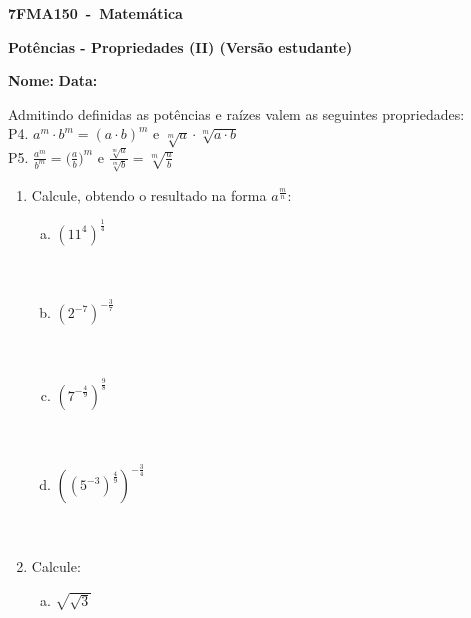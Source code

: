 \documentclass[a4paper,14pt]{article}
\begin{document}
	
	\noindent\textbf{7FMA150~-~Matemática} 
	
	\begin{center}
		\textbf{Potências - Propriedades (II) (Versão estudante)}
	\end{center}
	
	
	\noindent\textbf{Nome:} \underline{\hspace{10cm}}
    \noindent\textbf{Data:} \underline{\hspace{4cm}}
	
	
	\begin{multicols}{2}
		Admitindo definidas as potências e raízes valem as seguintes propriedades: \\
		P4. $a^m \cdot b^m = (a \cdot b)^m$ e $\sqrt[m]{a} \cdot \sqrt[m]{a \cdot b}$\\
		P5. $\frac{a^m}{b^m} = \bigg(\frac{a}{b}\bigg)^m$ e $\frac{\sqrt[m]{a}}{\sqrt[m]{b}} = \sqrt[m]{\frac{a}{b}}$ 
	\begin{enumerate}
		\item Calcule, obtendo o resultado na forma $a^\frac{m}{n}$:
		\begin{enumerate}[a)]
			\item $(11^4)^\frac{1}{4}$\\\\\\
			\item $(2^{-7})^{-\frac{3}{7}}$\\\\\\
			\item $(7^{-\frac{4}{9}})^\frac{9}{8}$\\\\\\
			\item $((5^{-3})^\frac{4}{9})^{-\frac{3}{4}}$\\\\\\
		\end{enumerate}
        \item Calcule:
        \begin{enumerate}[a)]
        	\item $\sqrt{\sqrt{3}}~$\\\\\\

\end{enumerate}
\end{enumerate}
\end{multicols}
\end{document}
